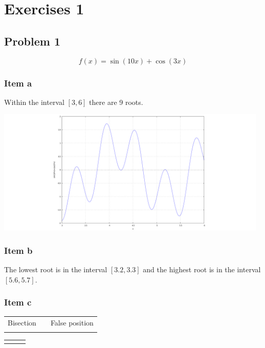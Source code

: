 \chapter{Exercises 1}
\section{Problem 1}
\begin{equation*}
	f(x)=\sin(10x)+\cos(3x)
\end{equation*}
\subsection{Item a}
Within the interval $[3,6]$ there are 9 roots.
\begin{center} \includegraphics[height=60mm,keepaspectratio]{EXER1T1-1-a} \end{center}

\subsection{Item b}
The lowest root is in the interval $[3.2,3.3]$ and the highest root is in the interval $[5.6,5.7]$.\\
\newpage

\subsection{Item c}
\begin{center}
\begin{tabular}{ p{73mm} p{0mm} p{73mm} }
	Bisection & & False position \\
	 & &
	
\end{tabular}
\end{center}

\begin{center}
\begin{tabular}{ p{74mm} p{0mm} p{74mm} }
	
	& &
	
\end{tabular}
\end{center}
